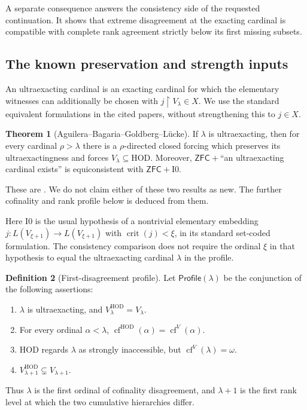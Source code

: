 \documentclass[11pt,letterpaper]{article}
\theoremstyle{definition}
\newtheorem{definition}{Definition}[section]
\newtheorem{theorem}[definition]{Theorem}
\newcommand{\ZFC}{\mathsf{ZFC}}
\newcommand{\HOD}{\mathrm{HOD}}
\newcommand{\crit}{\operatorname{crit}}
\newcommand{\cf}{\operatorname{cf}}
\newcommand{\restr}{\mathbin{\upharpoonright}}
\newcommand{\Izero}{\mathrm{I0}}
\newcommand{\Profile}{\mathsf{Profile}}
\begin{document}
A separate consequence answers the consistency side of the requested continuation. It shows that extreme disagreement at the exacting cardinal is compatible with complete rank agreement strictly below its first missing subsets.

\subsection{The known preservation and strength inputs}

An ultraexacting cardinal is an exacting cardinal for which the elementary witnesses can additionally be chosen with $j\restr V_\lambda\in X$. We use the standard equivalent formulations in the cited papers, without strengthening this to $j\in X$.

\begin{theorem}[Aguilera--Bagaria--Goldberg--L\"ucke]\label{input:coding}
If $\lambda$ is ultraexacting, then for every cardinal $\rho>\lambda$ there is a $\rho$-directed closed forcing which preserves its ultraexactingness and forces $V_\lambda\subseteq\HOD$. Moreover, $\ZFC+$``an ultraexacting cardinal exists'' is equiconsistent with $\ZFC+\Izero$.
\end{theorem}

These are \cite[Proposition 3.9 and Theorem 4.5]{abgl}. We do not claim either of these two results as new. The further cofinality and rank profile below is deduced from them.

Here $\Izero$ is the usual hypothesis of a nontrivial elementary embedding
$j:L(V_{\xi+1})\to L(V_{\xi+1})$ with $\crit(j)<\xi$, in its standard set-coded formulation. The consistency comparison does not require the ordinal $\xi$ in that hypothesis to equal the ultraexacting cardinal $\lambda$ in the profile.

\begin{definition}[First-disagreement profile]
Let $\Profile(\lambda)$ be the conjunction of the following assertions:
\begin{enumerate}
\item $\lambda$ is ultraexacting, and $V_\lambda^{\HOD}=V_\lambda$.
\item For every ordinal $\alpha<\lambda$,
      $\cf^{\HOD}(\alpha)=\cf^V(\alpha)$.
\item $\HOD$ regards $\lambda$ as strongly inaccessible, but $\cf^V(\lambda)=\omega$.
\item $V_{\lambda+1}^{\HOD}\subsetneq V_{\lambda+1}$.
\end{enumerate}
Thus $\lambda$ is the first ordinal of cofinality disagreement, and $\lambda+1$ is the first rank level at which the two cumulative hierarchies differ.
\end{definition}
\end{document}
